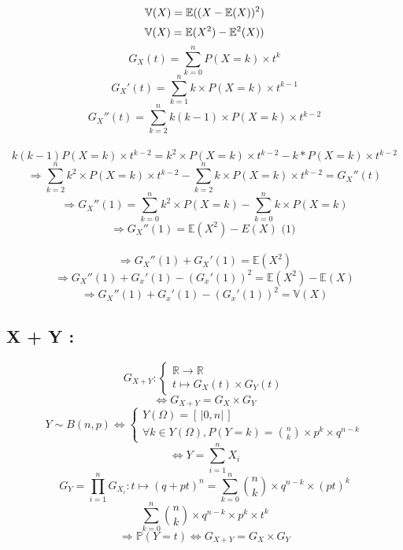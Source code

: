 \documentclass[a4paper,12pt]{article}
\begin{document}
\[
\mathbb{V}(X) = \mathbb{E} ((X - \mathbb{E}(X))^2) \\
\]
\[
\mathbb{V}(X) = \mathbb{E}(X^2) - \mathbb{E}^2(X))\\
\]
\[
G_X(t) = \sum_{k = 0}^{n}{P(X = k) \times t^k}
\]
\[
G_X'(t) = \sum_{k = 1}^{n}{k \times P(X = k) \times t^{k-1}}
\]
\[
G_X''(t) = \sum_{k = 2}^{n}{k(k-1) \times P(X = k) \times t^{k-2}}
\] \\
 \[ k(k-1)P(X = k) \times t^{k - 2} =
k^2 \times P(X = k) \times t^{k - 2} - k * P(X = k) \times t^{k-2} 
\]
\[
\Rightarrow \sum_{k = 2}^{n}{k^2 \times P(X = k) \times t^{k-2}} - \sum_{k = 2}^{n}{k \times P(X = k) \times t^{k-2}} = G_X''(t)
\]
\[
\Rightarrow G_X''(1)= \sum_{k = 0}^{n}{k^2 \times P(X = k) } - \sum_{k = 0}^{n}{k \times P(X = k) }
\]
\[
\Rightarrow G_X''(1) = \mathbb{E}(X^2) - E(X) \text{ (1) }
\] \\
 \[
\Rightarrow G_X''(1) + G_X'(1) = \mathbb{E}(X^2)
\] 
\[
\Rightarrow G_X''(1) + G_x'(1) - (G_x'(1))^2 = \mathbb{E}(X^2) - \mathbb{E}(X)
\]
\[
\Rightarrow G_X''(1) + G_x'(1) - (G_x'(1))^2 = \mathbb{V} (X)
\]

\subsection{X + Y :}
\[
G_{X+Y} : \begin{cases}
\mathbb{R} \rightarrow \mathbb{R} \\
t \mapsto G_X(t) \times G_Y(t)
\end{cases}
\]
\[
\Leftrightarrow G_{X+Y} = G_X \times G_Y
\]
\[
Y \sim B(n, p) \Leftrightarrow \begin{cases}
    Y(\Omega) =  \left[\,|0, n|\,\right] \\
    \forall k\in Y(\Omega), P(Y = k) = \binom{n}{k} \times p^k \times q^{n-k}
 \end{cases}
\]
\[
\Leftrightarrow Y = \sum_{i =1}^{n}{X_i}
\]
\[
G_Y = \prod_{i=1}^{n} {G_{X_i} :  t \mapsto(q + pt)^n = \sum_{k = 0}^{n} {\binom{n}{k} \times q^{n-k}\times (pt)^k}}
\]
\[
\sum_{k = 0}^{n} {\binom{n}{k} \times q^{n-k}\times p^k \times t^k}
\]
\[
\Rightarrow \mathbb{P}(Y = t) \Leftrightarrow G_{X+Y} = G_X \times G_Y
\]
\end{document}
